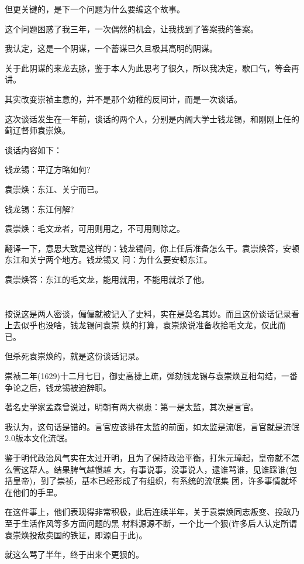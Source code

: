 \documentclass[11pt,a4paper,onecolumn]{article}
\begin{document}
但更关键的，是下一个问题\myrule 为什么要编这个故事。

这个问题困惑了我三年，一次偶然的机会，让我找到了答案\myrule 我的答案。

我认定，这是一个阴谋，一个蓄谋已久且极其高明的阴谋。

关于此阴谋的来龙去脉，鉴于本人为此思考了很久，所以我决定，歇口气，等会再讲。

其实改变崇祯主意的，并不是那个幼稚的反间计，而是一次谈话。

这次谈话发生在一年前，谈话的两个人，分别是内阁大学士钱龙锡，和刚刚上任的蓟辽督师袁崇焕。

谈话内容如下：

钱龙锡：平辽方略如何?

袁崇焕：东江、关宁而已。

钱龙锡：东江何解?

袁崇焕：毛文龙者，可用则用之，不可用则除之。

翻译一下，意思大致是这样的：钱龙锡问，你上任后准备怎么干。袁崇焕答，安顿东江和关宁两个地方。钱龙锡又
问：为什么要安顿东江。

袁崇焕答：东江的毛文龙，能用就用，不能用就杀了他。

\section[\thesection]{}

按说这是两人密谈，偏偏就被记入了史料，实在是莫名其妙。而且这份谈话记录看上去似乎也没啥，钱龙锡问袁崇
焕的打算，袁崇焕说准备收拾毛文龙，仅此而已。

但杀死袁崇焕的，就是这份谈话记录。

崇祯二年(1629)十二月七日，御史高捷上疏，弹劾钱龙锡与袁崇焕互相勾结，一番争论之后，钱龙锡被迫辞职。

著名史学家孟森曾说过，明朝有两大祸患：第一是太监，其次是言官。

我认为，这句话是错的。言官应该排在太监的前面，如太监是流氓，言官就是流氓2.0版本\myrule 文化流氓。

鉴于明代政治风气实在太过开明，且为了保持政治平衡，打朱元璋起，皇帝就不怎么管这帮人。结果脾气越惯越
大，有事说事，没事说人，逮谁骂谁，见谁踩谁(包括皇帝)，到了崇祯，基本已经形成了有组织，有系统的流氓集
团，许多事情就坏在他们的手里。

在这件事上，他们表现得非常积极，此后连续半年，关于袁崇焕同志叛变、投敌乃至于生活作风等多方面问题的黑
材料源源不断，一个比一个狠(许多后人认定所谓袁崇焕投敌卖国的铁证，即源自于此)。

就这么骂了半年，终于出来个更狠的。
\end{document}
